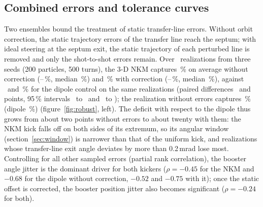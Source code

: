 \documentclass[a4paper,11pt]{article}
\begin{document}
\subsection{Combined errors and tolerance curves}

Two ensembles bound the treatment of static transfer-line errors. Without orbit correction, the static trajectory errors of the transfer line reach the septum; with ideal steering at the septum exit, the static trajectory of each perturbed line is removed and only the shot-to-shot errors remain. Over \RobN\ realizations from three seeds (200 particles, 500 turns), the 3-D NKM captures \RobMean\,\% on average without correction (\RobMeanLo--\RobMeanHi\,\%, median \RobMedian\,\%) and \RobCMean\,\% with correction (\RobCMeanLo--\RobCMeanHi\,\%, median \RobCMedian\,\%), against \RobDipMean\ and \RobCDipMean\,\% for the dipole control on the same realizations (paired differences \RobNkmMinusDip\ and \RobCNkmMinusDip\,points, 95\,\% intervals \RobNkmMinusDipLo\ to \RobNkmMinusDipHi\ and \RobCNkmMinusDipLo\ to \RobCNkmMinusDipHi); the realization without errors captures \RobZeroErr\,\% (dipole \RobZeroErrDip\,\%) (figure~\ref{fig:robust}, left). The deficit with respect to the dipole thus grows from about two points without errors to about twenty with them: the NKM kick falls off on both sides of its extremum, so its angular window (section~\ref{sec:window}) is narrower than that of the uniform kick, and realizations whose transfer-line exit angle deviates by more than 0.2\,mrad lose most. Controlling for all other sampled errors (partial rank correlation), the booster angle jitter is the dominant driver for both kickers ($\rho=-0.45$ for the NKM and $-0.68$ for the dipole without correction, $-0.52$ and $-0.75$ with it); once the static offset is corrected, the booster position jitter also becomes significant ($\rho=-0.24$ for both).
\end{document}
